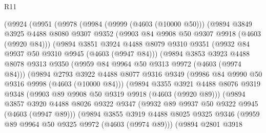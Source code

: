 \begin{lexlean}{R11}
\begin{coremodule}
              (@9924
                (@9951
                  (@9978
                    (@9984
                      (@9999 (@4603 (@10000 @50)))
                      (@9894
                        @3849
                        @3925
                        @4488
                        @8080
                        @9307
                        @9352
                        (@9903 @84 @9908 @50 @9307 @9918 (@4603 (@9920 @84)))
                        (@9894
                          @3851
                          @3924
                          @4488
                          @8079
                          @9310
                          @9351
                          (@9932 @84 @9937 @50 @9310 @9945 (@4603 (@9947 @84)))
                          (@9894
                            @3853
                            @3923
                            @4488
                            @8078
                            @9313
                            @9350
                            (@9959 @84 @9964 @50 @9313 @9972 (@4603 (@9974 @84)))
                            (@9894
                              @2793
                              @3922
                              @4488
                              @8077
                              @9316
                              @9349
                              (@9986 @84 @9990 @50 @9316 @9998 (@4603 (@10000 @84)))
                              (@9894
                                @3355
                                @3921
                                @4488
                                @8076
                                @9319
                                @9348
                                (@9903 @89 @9908 @50 @9319 @9918 (@4603 (@9920 @89)))
                                (@9894
                                  @3857
                                  @3920
                                  @4488
                                  @8026
                                  @9322
                                  @9347
                                  (@9932 @89 @9937 @50 @9322 @9945 (@4603 (@9947 @89)))
                                  (@9894
                                    @3855
                                    @3919
                                    @4488
                                    @8025
                                    @9325
                                    @9346
                                    (@9959 @89 @9964 @50 @9325 @9972 (@4603 (@9974 @89)))
                                    (@9894
                                      @2801
                                      @3918

\end{coremodule}
\end{lexlean}
